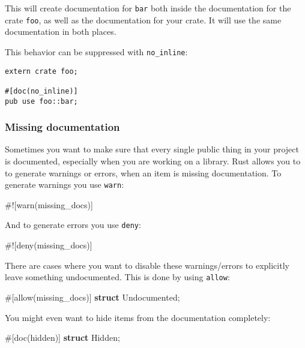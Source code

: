 \documentclass[a4paper,]{book}
\newenvironment{Shaded}{\begin{snugshade}}{\end{snugshade}}
\newcommand{\KeywordTok}[1]{\textcolor[rgb]{0.13,0.29,0.53}{\textbf{{#1}}}}
\newcommand{\OtherTok}[1]{\textcolor[rgb]{0.56,0.35,0.01}{{#1}}}
\newcommand{\NormalTok}[1]{{#1}}
\begin{document}
This will create documentation for \texttt{bar} both inside the
documentation for the crate \texttt{foo}, as well as the documentation
for your crate. It will use the same documentation in both places.

This behavior can be suppressed with \texttt{no\_inline}:

\begin{verbatim}
extern crate foo;

#[doc(no_inline)]
pub use foo::bar;
\end{verbatim}

\subsubsection{Missing documentation}\label{missing-documentation}

Sometimes you want to make sure that every single public thing in your
project is documented, especially when you are working on a library.
Rust allows you to to generate warnings or errors, when an item is
missing documentation. To generate warnings you use \texttt{warn}:

\begin{Shaded}
\begin{Highlighting}[]
\NormalTok{#![warn(missing_docs)]}
\end{Highlighting}
\end{Shaded}

And to generate errors you use \texttt{deny}:

\begin{Shaded}
\begin{Highlighting}[]
\NormalTok{#![deny(missing_docs)]}
\end{Highlighting}
\end{Shaded}

There are cases where you want to disable these warnings/errors to
explicitly leave something undocumented. This is done by using
\texttt{allow}:

\begin{Shaded}
\begin{Highlighting}[]
\OtherTok{#[}\NormalTok{allow}\OtherTok{(}\NormalTok{missing_docs}\OtherTok{)]}
\KeywordTok{struct} \NormalTok{Undocumented;}
\end{Highlighting}
\end{Shaded}

You might even want to hide items from the documentation completely:

\begin{Shaded}
\begin{Highlighting}[]
\OtherTok{#[}\NormalTok{doc}\OtherTok{(}\NormalTok{hidden}\OtherTok{)]}
\KeywordTok{struct} \NormalTok{Hidden;}
\end{Highlighting}
\end{Shaded}
\end{document}
